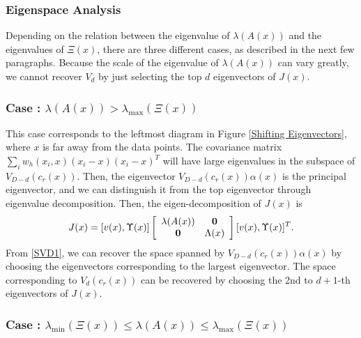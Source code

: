\documentclass[aos,preprint]{imsart}
\theoremstyle{remark}
\begin{document}
\subsubsection{Eigenspace Analysis}
Depending on the relation between the eigenvalue of $\lambda(A(x))$ and the eigenvalues of $\Xi(x)$, there are three different cases, as described in the next few paragraphs. Because the scale of the eigenvalue of $\lambda(A(x))$ can vary greatly, we cannot recover $V_d$ by just selecting the top $d$ eigenvectors of $J(x)$.

\subsubsection*{Case : $\lambda(A(x))>\lambda_{\max} (\Xi(x))$}

This case corresponds to the leftmost diagram in {Figure \ref{Shifting Eigenvectors}}, where $x$ is far away from the data points. The covariance matrix $\sum_i w_h(x_i, x)(x_i-x)(x_i-x)^T$ will have large eigenvalues in the subspace of $V_{D-d}(c_r(x))$. Then, the eigenvector $V_{D-d}(c_r(x))\alpha(x)$ is the principal eigenvector, and we can distinguish it from the top eigenvector through eigenvalue decomposition.
Then, the eigen-decomposition of $J(x)$ is
\begin{equation}\label{SVD1}
J (x)= [v(x), \Upsilon(x)] 
\left[
\begin{array}{cc}
\lambda(A(x)) & \bf 0\\
\bf 0 &\Lambda(x)
\end{array}
\right][v(x), \Upsilon(x)]^T.
\end{equation}
From \eqref{SVD1}, we can recover the space spanned by $V_{D-d}(c_r(x))\alpha(x)$ by choosing the eigenvectors corresponding to the largest eigenvector. The space corresponding to $V_d(c_r(x))$ can be recovered by choosing the 2nd to $d+1$-th eigenvectors of $J(x)$.

\subsubsection*{Case : $\lambda_{\min} (\Xi(x)) \leq \lambda(A(x))\leq \lambda_{\max} (\Xi(x))$}
\end{document}
